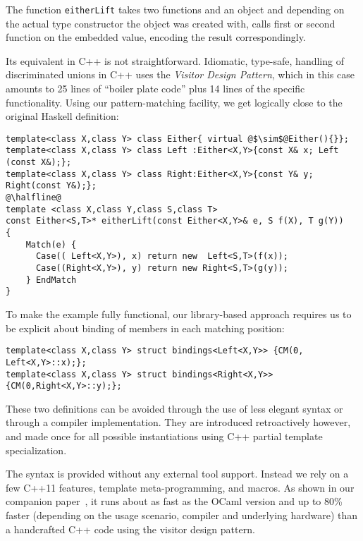 \documentclass{llncs}
\DeclareRobustCommand{\codehaskell}[1]{{\lstinline[breaklines=false,language=Haskell]{#1}}}
\begin{document}
\noindent
The function \codehaskell{eitherLift} takes two functions and an 
object and depending on the actual type constructor the object was created with, 
calls first or second function on the embedded value, encoding the result 
correspondingly.

Its equivalent in C++ is not straightforward. Idiomatic, type-safe, handling of 
discriminated unions in C++ uses the \emph{Visitor Design Pattern}\cite{DesignPatterns}, 
which in this case amounts to 25 lines of ``boiler plate code'' plus 14 lines 
of the specific functionality. Using our 
pattern-matching facility, we get logically close to the original Haskell definition:

\begin{lstlisting}[keepspaces,columns=flexible]
template<class X,class Y> class Either{ virtual @$\sim$@Either(){}};
template<class X,class Y> class Left :Either<X,Y>{const X& x; Left (const X&);};
template<class X,class Y> class Right:Either<X,Y>{const Y& y; Right(const Y&);};
@\halfline@
template <class X,class Y,class S,class T>
const Either<S,T>* eitherLift(const Either<X,Y>& e, S f(X), T g(Y))
{
    Match(e) {
      Case(( Left<X,Y>), x) return new  Left<S,T>(f(x));
      Case((Right<X,Y>), y) return new Right<S,T>(g(y));
    } EndMatch
}
\end{lstlisting}

\noindent
To make the example fully functional, our library-based approach requires us to 
be explicit about binding of members in each matching position:

\begin{lstlisting}[keepspaces,columns=flexible]
template<class X,class Y> struct bindings<Left<X,Y>> {CM(0, Left<X,Y>::x);};
template<class X,class Y> struct bindings<Right<X,Y>>{CM(0,Right<X,Y>::y);};
\end{lstlisting}

\noindent
These two definitions can be avoided through the use of less elegant syntax
or through a compiler implementation.
They are introduced retroactively however, and made once for all 
possible instantiations using C++ partial template specialization. 

The syntax is provided without any external tool support. Instead we rely on a 
few C++11 features\cite{C++11}, template meta-programming, and macros. As shown 
in our companion paper~\cite{TypeSwitch}, it runs about as fast as the OCaml 
version and up to 80\% faster (depending on the usage scenario, compiler and 
underlying hardware) than a handcrafted C++ code using the visitor 
design pattern.
\end{document}

